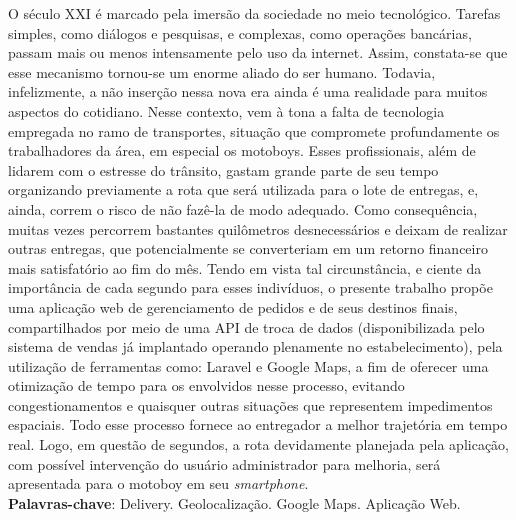 
\begin{resumo}[RESUMO]
\begin{SingleSpacing}


O século XXI é marcado pela imersão da sociedade no meio tecnológico. Tarefas simples, como diálogos e pesquisas, e complexas, como operações bancárias, passam mais ou menos intensamente pelo uso da internet. Assim, constata-se que esse mecanismo tornou-se um enorme aliado do ser humano. Todavia, infelizmente, a não inserção nessa nova era ainda é uma realidade para muitos aspectos do cotidiano. Nesse contexto, vem à tona a falta de tecnologia empregada no ramo de transportes, situação que compromete profundamente os trabalhadores da área, em especial os motoboys. Esses profissionais, além de lidarem com o estresse do trânsito, gastam grande parte de seu tempo organizando previamente a rota que será utilizada para o lote de entregas, e, ainda, correm o risco de não fazê-la de modo adequado. Como consequência, muitas vezes percorrem bastantes quilômetros desnecessários e deixam de realizar outras entregas, que potencialmente se converteriam em um retorno financeiro mais satisfatório ao fim do mês. Tendo em vista tal circunstância, e ciente da importância de cada segundo para esses indivíduos, o presente trabalho propõe uma aplicação web de gerenciamento de pedidos e de seus destinos finais, compartilhados por meio de uma API de troca de dados (disponibilizada pelo sistema de vendas já implantado operando plenamente no estabelecimento), pela utilização de ferramentas como: Laravel e Google Maps, a fim de oferecer uma otimização de tempo para os envolvidos nesse processo, evitando congestionamentos e quaisquer outras situações que representem impedimentos espaciais. Todo esse processo fornece ao entregador a melhor trajetória em tempo real. Logo, em questão de segundos, a rota devidamente planejada pela aplicação, com possível intervenção do usuário administrador para melhoria, será apresentada para o motoboy em seu \textit{smartphone}.\\

\textbf{Palavras-chave}: Delivery. Geolocalização. Google Maps. Aplicação Web.

\end{SingleSpacing}
\end{resumo}